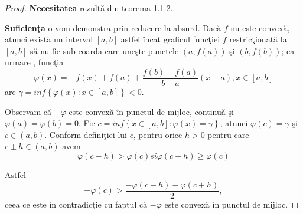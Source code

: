 \documentclass[a4paper,12pt,oneside]{report}
\begin{document}
\begin{proof}
\textbf{Necesitatea }rezult\u{a} din teorema 1.1.2.

\textbf{Suficien\c{t}a} o vom demonstra prin reducere la absurd. Dac\u{a} \(f\) nu este convex\u{a}, atunci exist\u{a} un interval \(\left [ a,b \right ]\) astfel \^{i}ncat graficul func\c{t}iei \(f\) restric\c{t}ionat\u{a} la  \(\left [ a,b \right ]\) s\u{a} nu fie sub coarda care une\c{s}te punctele \(\left ( a, f\left ( a \right ) \right )\) \c{s}i \(\left ( b, f\left ( b \right ) \right )\); ca urmare , func\c{t}ia
\begin{displaymath}
  \varphi \left ( x \right )= -f\left ( x \right ) + f\left ( a \right )+ \frac{f\left ( b \right )- f\left ( a \right )}{b-a}\left ( x-a \right ), x\in \left [ a,b \right ]
\end{displaymath}
are  \(\gamma = inf \left \{ \varphi \left ( x \right ) : x\in \left [ a,b \right ]\right \}< 0\).

Observam c\u{a} \(-\varphi\) este convex\u{a} \^{i}n punctul de mijloc, continu\u{a} \c{s}i \(\varphi \left ( a \right ) =\varphi \left ( b \right ) = 0\). Fie \(c = inf \left \{ x \in \left [ a,b  \right ] : \varphi \left ( x \right )= \gamma \right \} \), atunci \(\varphi \left ( c \right ) = \gamma\)  \c{s}i \(c \in \left ( a,b  \right )\). Conform defini\c{t}iei lui \(c\), pentru orice \(h>0\) pentru care \(c\pm h\in \left ( a,b \right )\) avem
\begin{displaymath}
  \varphi \left ( c - h  \right )> \varphi \left ( c \right ) si \varphi \left ( c + h  \right )\geq  \varphi \left ( c \right )
\end{displaymath}

Astfel
\begin{displaymath}
  -\varphi \left ( c \right )> \frac{-\varphi \left ( c-h \right )-\varphi \left ( c+h \right )}{2},
\end{displaymath}
ceea ce este \^{i}n contradic\c{t}ie cu faptul c\u{a} \(-\varphi\) este convex\u{a} \^{i}n punctul de mijloc.
\end{proof}
\end{document}

